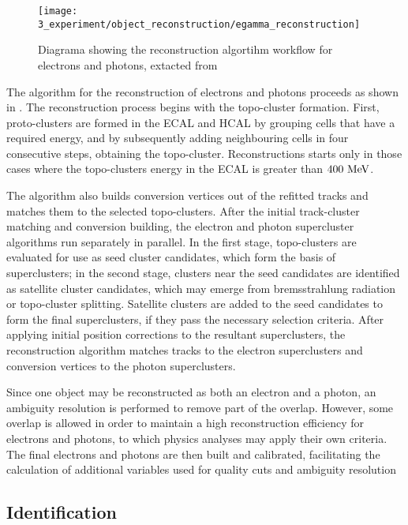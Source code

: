 \begin{figure}[ht!]
    \centering
    \texttt{[image: 3\_experiment/object\_reconstruction/egamma\_reconstruction]}
    \caption{Diagrama showing the reconstruction algortihm workflow for electrons and photons, extacted from }
    \label{fig:objects:egamma:reco:reco_diagram}
\end{figure}

The algorithm for the reconstruction of electrons and photons proceeds as shown in \Fig{\ref{fig:objects:egamma:reco:reco_diagram}}.
The reconstruction process begins with the topo-cluster formation. First, proto-clusters are formed in the \ac{ECAL} and \ac{HCAL} by grouping cells that have a required energy, and by subsequently adding neighbouring cells in four consecutive steps, obtaining the topo-cluster. Reconstructions starts only in those cases where the topo-clusters energy in the \ac{ECAL} is greater than \(400~\text{MeV}\).

The algorithm also builds conversion vertices out of the refitted tracks and matches them to the selected topo-clusters.
After the initial track-cluster matching and conversion building, the electron and photon supercluster algorithms run separately in parallel. In the first stage, topo-clusters are evaluated for use as seed cluster candidates, which form the basis of superclusters; in the second stage, clusters near the seed candidates are identified as satellite cluster candidates, which may emerge from bremsstrahlung radiation or topo-cluster splitting. Satellite clusters are added to the seed candidates to form the final superclusters, if they pass the necessary selection criteria.
After applying initial position corrections to the resultant superclusters, the reconstruction algorithm matches tracks to
the electron superclusters and conversion vertices to the photon superclusters.

Since one object may be reconstructed as both an electron and a photon, an ambiguity resolution is performed to remove part of the overlap. However, some overlap is allowed in order to maintain a high reconstruction efficiency for electrons and photons, to which physics analyses may apply their own criteria. The final electrons and photons are then built and calibrated, facilitating the calculation of additional variables used for quality cuts and ambiguity resolution



\subsection{Identification}
\label{subsec:objects:egamma:id}

